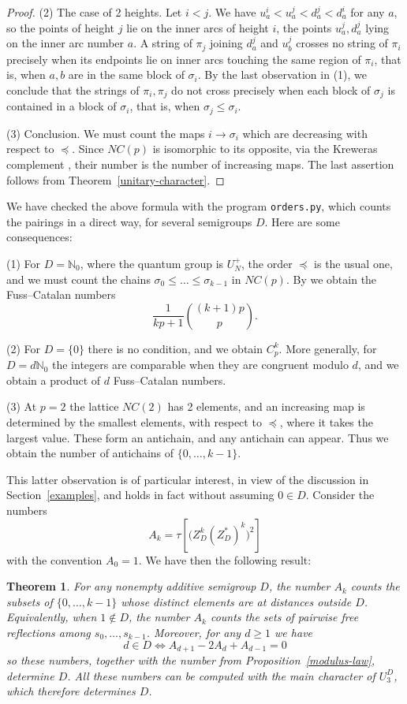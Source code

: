 \documentclass[11pt,a4paper]{article}
\newtheorem{thm}{Theorem}[section]
\begin{document}
\begin{proof}
(2) The case of 2 heights. Let $i<j$. We have $u_a^i<u_a^j<d_a^j<d_a^i$ for any $a$, so the points of height $j$ lie on the inner arcs of height $i$, the points $u_a^j,d_a^j$ lying on the inner arc number $a$. A string of $\pi_j$ joining $d_a^j$ and $u_b^j$ crosses no string of $\pi_i$ precisely when its endpoints lie on inner arcs touching the same region of $\pi_i$, that is, when $a,b$ are in the same block of $\sigma_i$. By the last observation in (1), we conclude that the strings of $\pi_i,\pi_j$ do not cross precisely when each block of $\sigma_j$ is contained in a block of $\sigma_i$, that is, when $\sigma_j\leq\sigma_i$.

(3) Conclusion. We must count the maps $i\to\sigma_i$ which are decreasing with respect to $\preceq$. Since $NC(p)$ is isomorphic to its opposite, via the Kreweras complement \cite{kreweras}, their number is the number of increasing maps. The last assertion follows from Theorem~\ref{unitary-character}.
\end{proof}

We have checked the above formula with the program \texttt{orders.py}, which counts the pairings in a direct way, for several semigroups $D$. Here are some consequences:

(1) For $D=\mathbb N_0$, where the quantum group is $U_N^+$, the order $\preceq$ is the usual one, and we must count the chains $\sigma_0\leq\ldots\leq\sigma_{k-1}$ in $NC(p)$. By \cite{edelman} we obtain the Fuss--Catalan numbers
\[
 \frac{1}{kp+1}\binom{(k+1)p}{p}.
\]

(2) For $D=\{0\}$ there is no condition, and we obtain $C_p^k$. More generally, for $D=d\mathbb N_0$ the integers are comparable when they are congruent modulo $d$, and we obtain a product of $d$ Fuss--Catalan numbers.

(3) At $p=2$ the lattice $NC(2)$ has 2 elements, and an increasing map is determined by the smallest elements, with respect to $\preceq$, where it takes the largest value. These form an antichain, and any antichain can appear. Thus we obtain the number of antichains of $\{0,\ldots,k-1\}$.

This latter observation is of particular interest, in view of the discussion in Section~\ref{examples}, and holds in fact without assuming $0\in D$. Consider the numbers
\[
 A_k=\tau\!\left[\bigl(Z_D^k(Z_D^*)^k\bigr)^2\right]
\]
with the convention $A_0=1$. We have then the following result:

\begin{thm}\label{character-recovery}
For any nonempty additive semigroup $D$, the number $A_k$ counts the subsets of $\{0,\ldots,k-1\}$ whose distinct elements are at distances outside $D$. Equivalently, when $1\notin D$, the number $A_k$ counts the sets of pairwise free reflections among $s_0,\ldots,s_{k-1}$. Moreover, for any $d\geq1$ we have
\[
 d\in D\iff A_{d+1}-2A_d+A_{d-1}=0
\]
so these numbers, together with the number from Proposition~\ref{modulus-law}, determine $D$. All these numbers can be computed with the main character of $U_3^D$, which therefore determines $D$.
\end{thm}
\end{document}
